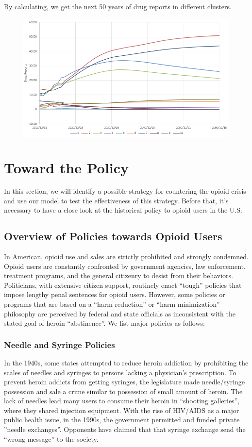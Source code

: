 \documentclass[11pt]{article}
\begin{document}
By calculating, we get the next 50 years of drug reports in different clusters. 
\begin{figure}[H]
	\centering
	\includegraphics[scale=0.7]{./figures/12.png}
	\caption{}
	\label{Fig12}
\end{figure}

\section{Toward the Policy}
In this section, we will identify a possible strategy for countering the opioid crisis and use our model to test the effectiveness of this strategy. Before that, it’s necessary to have a close look at the historical policy to opioid users in the U.S.

\subsection{Overview of Policies towards Opioid Users} %
In American, opioid use and sales are strictly prohibited and strongly condemned. Opioid users are constantly confronted by government agencies, law enforcement, treatment programs, and the general citizenry to desist from their behaviors. Politicians, with extensive citizen support, routinely enact “tough” policies that impose lengthy penal sentences for opioid users. However, some policies or programs that are based on a “harm reduction” or “harm minimization” philosophy are perceived by federal and state officials as inconsistent with the stated goal of heroin “abstinence”. We list major policies as follows:

\subsubsection{Needle and Syringe Policies}
In the 1940s, some states attempted to reduce heroin addiction by prohibiting the scales of needles and syringes to persons lacking a physician’s prescription. To prevent heroin addicts from getting syringes, the legislature made needle/syringe possession and sale a crime similar to possession of small amount of heroin. The lack of needles lead  many users to consume their heroin in “shooting galleries”, where they shared injection equipment. With the rise of HIV/AIDS as a major public health issue, in the 1990s, the government permitted and funded private ”needle exchanges”. Opponents have claimed that that syringe exchange send the “wrong message” to the society.
\end{document}

